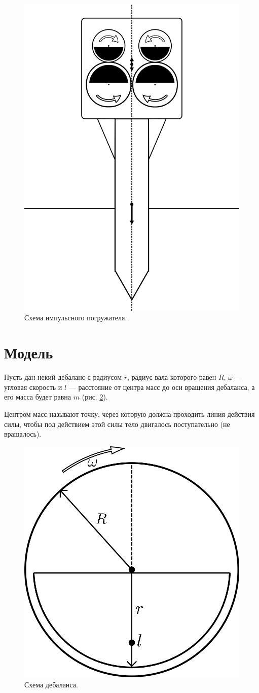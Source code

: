 \begin{figure}[h]
    \centering
    \includegraphics[width=0.5\linewidth]{img/scheme_porg.png}
    \caption{Схема импульсного погружателя.}
    \label{fig:scheme_porg}
\end{figure}


\clearpage
\section{Модель}

Пусть дан некий дебаланс с радиусом $r$, радиус вала которого равен $R$, $\omega$ --- угловая скорость и $l$ --- расстояние от центра масс до оси вращения дебаланса, а его масса будет равна $m$ (рис. \ref{fig:debalance}). 

\begin{definition}
    Центром масс называют точку, через которую должна проходить линия действия силы, чтобы под действием этой силы тело двигалось поступательно (не вращалось).
\end{definition}

\begin{figure}[h]
    \centering
    \includegraphics[width=0.4\linewidth]{img/debalance.png}
    \caption{Схема дебаланса.}
    \label{fig:debalance}
\end{figure}

